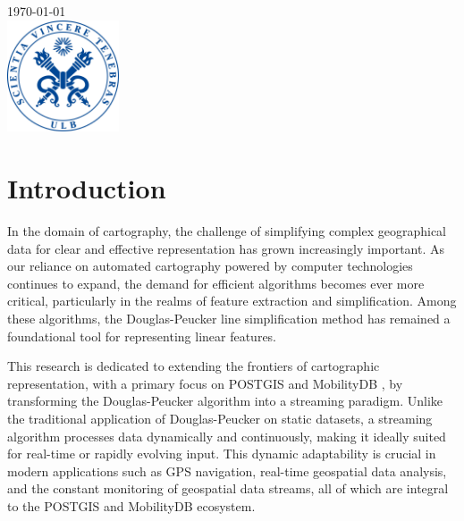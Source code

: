 \documentclass[twoside,12pt, a4paper]{report}
\begin{document}
\begin{titlepage}

{\large \today}\\[1cm] %


\includegraphics[width=3.3cm, height=3.3cm]{sceau-a-quadri.jpg}%
 

\end{titlepage}

\tableofcontents
\newpage


\chapter{Introduction}
In the domain of cartography, the challenge of simplifying complex geographical data for clear and effective representation has grown increasingly important. As our reliance on automated cartography powered by computer technologies continues to expand, the demand for efficient algorithms becomes ever more critical, particularly in the realms of feature extraction and simplification. Among these algorithms, the Douglas-Peucker line simplification method has remained a foundational tool for representing linear features.

This research is dedicated to extending the frontiers of cartographic representation, with a primary focus on POSTGIS and MobilityDB \cite{zimanyi2019mobilitydb}, by transforming the Douglas-Peucker algorithm into a streaming paradigm. Unlike the traditional application of Douglas-Peucker on static datasets, a streaming algorithm processes data dynamically and continuously, making it ideally suited for real-time or rapidly evolving input. This dynamic adaptability is crucial in modern applications such as GPS navigation, real-time geospatial data analysis, and the constant monitoring of geospatial data streams, all of which are integral to the POSTGIS and MobilityDB ecosystem.
\end{document}
